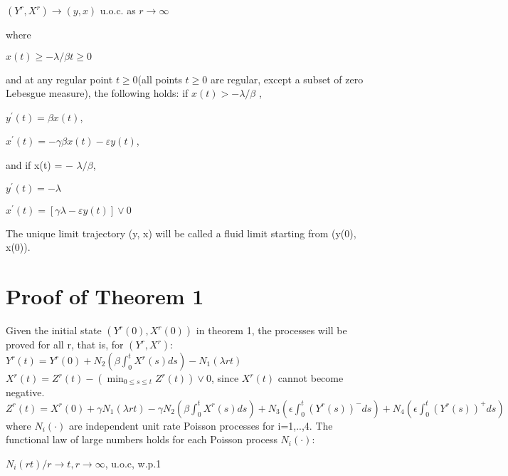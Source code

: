 \begin{center} $(Y^r , X^r)\rightarrow (y,x)$ u.o.c. as $r\rightarrow \infty$
\end{center}

\newline where

\begin{center} $x(t)\geq −\lambda/ \beta t\geq 0$
\end{center}
and at any regular point $t \geq 0 $(all points $t\geq 0$ are regular, except a subset of zero Lebesgue measure), the following holds: if $x(t)> −\lambda/ \beta$ , 
\begin{center} 
\newline $y ^\prime (t) = \beta x(t)$,

\newline $x ^\prime (t) = −\gamma \beta x(t) - \varepsilon y(t)$, 
\end{center}
and if x(t) = − $\lambda/\beta$,
\begin{center} 
\newline $y ^\prime (t) = -\lambda$

\newline $x ^\prime (t) = [\gamma \lambda - \varepsilon y(t)] \vee 0$
\end{center}
The unique limit trajectory (y, x) will be called a fluid limit starting from (y(0), x(0)).
	
\section*{Proof of Theorem 1}

Given the initial state $(Y^r(0), X^r (0))$ in theorem 1, the processes will be proved for all r, that is, for $(Y^r , X^r)$:
\newline
\newline$Y^r(t)=Y^r(0) +N_2 (\beta \int_0^tX^r(s)ds)-N_1(\lambda rt) $
\newline
\newline $X^r(t)= Z^r(t) - (\min_{0\leq s\leq t} Z^r(t)) \vee 0$, since $X^r(t)$ cannot become negative.
\newline
\newline $Z^r(t)=X^r(0) + \gamma N_1(\lambda rt) - \gamma N_2(\beta \int_0^tX^r(s)ds) +N_3(\epsilon \int_0^t(Y^r(s))^-ds) + N_4(\epsilon \int_0^t(Y^r(s))^+ds)$
\newline
\newline where $N_i(\cdot)$ are independent unit rate Poisson processes for i=1,..,4.
\newline
\newline The functional law of large numbers holds for each Poisson process $N_i(\cdot)$:
\newline
\begin{center}$ N_i(rt)/r \rightarrow t,r \rightarrow \infty$, u.o.c, w.p.1
\end{center}


